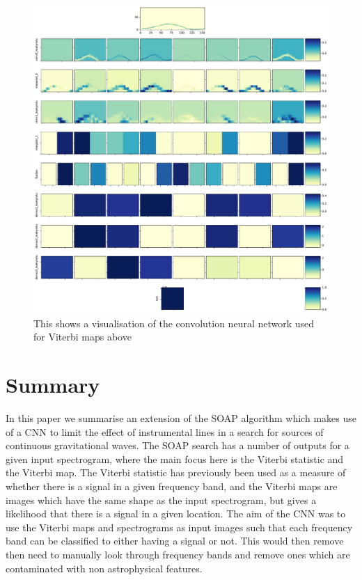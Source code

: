\begin{figure}[h]
	\centering
	\includegraphics[width=\textwidth]{C4_cnn/vitmap_cnn_visualisation_signal.pdf}
	\caption[Network visualisation]{This shows a visualisation of the convolution neural network used for Viterbi maps above}
	\label{cnn:vis:vitmap:signal}
\end{figure}


\section{Summary}

In this paper we summarise an extension of the SOAP algorithm which makes use of a \gls{CNN} to limit the effect of instrumental lines in a search for sources of continuous gravitational waves.
The SOAP search has a number of outputs for a given input spectrogram, where the main focus here is the Viterbi statistic and the Viterbi map. 
The Viterbi statistic has previously been used as a measure of whether there is a signal in a given frequency band, and the Viterbi maps are images which have the same shape as the input spectrogram, but gives a likelihood that there is a signal in a given location. 
The aim of the \gls{CNN} was to use the Viterbi maps and spectrograms as input images such that each frequency band can be classified to either having a signal or not. 
This would then remove then need to manually look through frequency bands and remove ones which are contaminated with non astrophysical features. 

